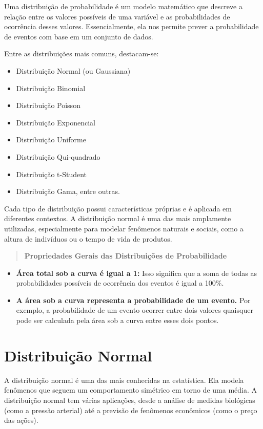 \documentclass[
]{book}
\providecommand{\tightlist}{%
  \setlength{\itemsep}{0pt}\setlength{\parskip}{0pt}}
\begin{document}
Uma distribuição de probabilidade é um modelo matemático que descreve a relação entre os valores possíveis de uma variável e as probabilidades de ocorrência desses valores. Essencialmente, ela nos permite prever a probabilidade de eventos com base em um conjunto de dados.

Entre as distribuições mais comuns, destacam-se:

\begin{itemize}
\tightlist
\item
  Distribuição Normal (ou Gaussiana)
\item
  Distribuição Binomial
\item
  Distribuição Poisson
\item
  Distribuição Exponencial
\item
  Distribuição Uniforme
\item
  Distribuição Qui-quadrado
\item
  Distribuição t-Student
\item
  Distribuição Gama, entre outras.
\end{itemize}

Cada tipo de distribuição possui características próprias e é aplicada em diferentes contextos. A distribuição normal é uma das mais amplamente utilizadas, especialmente para modelar fenômenos naturais e sociais, como a altura de indivíduos ou o tempo de vida de produtos.

\begin{quote}
\textbf{Propriedades Gerais das Distribuições de Probabilidade}
\end{quote}

\begin{itemize}
\tightlist
\item
  \textbf{Área total sob a curva é igual a 1:} Isso significa que a soma de todas as probabilidades possíveis de ocorrência dos eventos é igual a 100\%.
\item
  \textbf{A área sob a curva representa a probabilidade de um evento.} Por exemplo, a probabilidade de um evento ocorrer entre dois valores quaisquer pode ser calculada pela área sob a curva entre esses dois pontos.
\end{itemize}

\section{Distribuição Normal}\label{distribuiuxe7uxe3o-normal}

A distribuição normal é uma das mais conhecidas na estatística. Ela modela fenômenos que seguem um comportamento simétrico em torno de uma média. A distribuição normal tem várias aplicações, desde a análise de medidas biológicas (como a pressão arterial) até a previsão de fenômenos econômicos (como o preço das ações).
\end{document}
